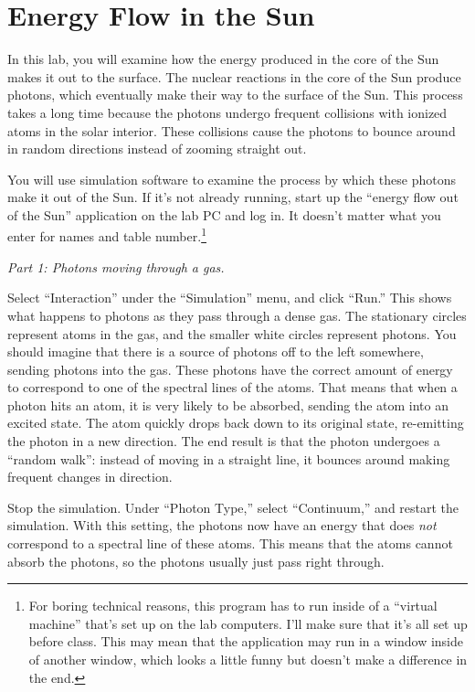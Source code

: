 \chapter{Energy Flow in the Sun}


In this lab, you will examine how the energy produced in the core
of the Sun makes it out to the surface.  The nuclear reactions in
the core of the Sun produce photons, which eventually make their way
to the surface of the Sun.  This process takes a long time because
the photons undergo frequent collisions with ionized atoms
in the solar interior.  These collisions cause the photons to
bounce around in random directions instead of zooming
straight out.

You will use simulation software to examine the process by which
these photons make it out of the Sun.
If it's not already running, 
start up the ``energy flow out of the Sun'' application on the lab
PC and log
in.  It doesn't matter what you enter for names and table number.\footnote{For 
boring technical reasons, this program has to run inside of a 
``virtual machine'' that's set up on the lab computers. I'll make sure
that it's all set up before class. This may mean that the application
may run in a window inside of another window, which looks a little funny
but doesn't make a difference in the end. }

\medskip

{\it Part 1: Photons moving through a gas.}

Select ``Interaction'' under the ``Simulation'' menu, and click
``Run.''  This shows what happens to photons as they pass through a
dense gas.  The stationary circles represent atoms in the gas, and the
smaller white circles represent photons.  You should imagine that
there is a source of photons off to the left somewhere, sending
photons into the gas.  These photons have the correct amount of energy
to correspond to one of the spectral lines of the atoms.  That means
that when a photon hits an atom, it is very likely to be absorbed,
sending the atom into an excited state.  The atom quickly drops
back down to its original state, re-emitting the photon in a new direction.
The end result is that the photon undergoes a ``random walk'': instead
of moving in a straight line, it bounces around making frequent
changes in direction.

Stop the simulation.  Under ``Photon Type,'' select ``Continuum,'' and
restart the simulation.  With this setting, the photons now have an
energy that does {\it not} correspond to a spectral line of these
atoms.  This means that the atoms cannot absorb the photons, so the
photons usually just pass right through.  

